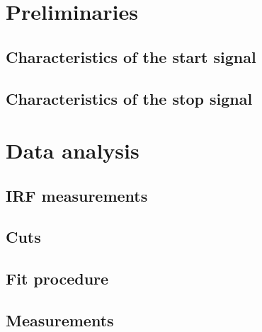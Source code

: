 \section{Preliminaries}

\subsection{Characteristics of the start signal}


\subsection{Characteristics of the stop signal}




\section{Data analysis}

\subsection{IRF measurements}

\subsection{Cuts}

\subsection{Fit procedure}

\subsection{Measurements}